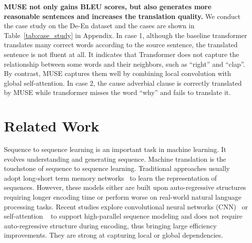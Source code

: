 \documentclass{article} \usepackage{iclr2020_conference,times}
\begin{document}
\textbf{MUSE not only gains BLEU scores, but also generates more reasonable sentences and increases the translation quality.}
We conduct the case study on the De-En dataset and the cases are shown in Table~\ref{tab:case_study} in Appendix.  In case 1, although the baseline transformer translates many correct words according to the source sentence, the translated sentence is not fluent at all.  It indicates that Transformer does not capture the relationship between some words and their neighbors, such as ``right'' and ``clap''. By contrast, MUSE captures them well by combining local convolution with global self-attention. In case 2, the cause adverbial clause is correctly translated by MUSE while transformer misses the word ``why'' and fails to translate it.











\section{Related Work}
Sequence to sequence learning is an important task in machine learning. It evolves understanding and generating sequence. Machine translation is the touchstone of sequence to sequence learning. Traditional approaches usually adopt long-short term memory networks~\citep{sutskever2014sequence,ma-etal-2018-bag}  to learn the representation of sequences. However, these models either are built upon auto-regressive structures requiring longer encoding time or perform worse on real-world natural language processing tasks.
Recent studies  explore convolutional neural networks (CNN)~\citep{gehring2017convolutional} or self-attention ~\citep{vaswani2017attention} to  support high-parallel sequence modeling and does not require auto-regressive structure during encoding, thus bringing large efficiency improvements. They are strong at capturing local or global dependencies.
\end{document}

